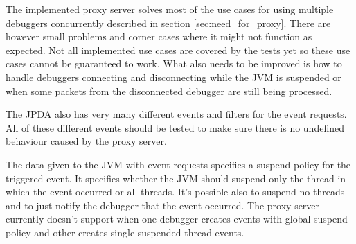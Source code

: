 \documentclass[..thesis.tex]{subfiles}
\begin{document}
The implemented proxy server solves most of the use cases for using multiple debuggers concurrently described in section \ref{sec:need_for_proxy}.
There are however small problems and corner cases where it might not function as expected.
Not all implemented use cases are covered by the tests yet so these use cases cannot be guaranteed to work.
What also needs to be improved is how to handle debuggers connecting and disconnecting while the JVM is suspended or when some packets from the disconnected debugger are still being processed.

The JPDA also has very many different events and filters for the event requests.
All of these different events should be tested to make sure there is no undefined behaviour caused by the proxy server.

The data given to the JVM with event requests specifies a suspend policy for the triggered event.
It specifies whether the JVM should suspend only the thread in which the event occurred or all threads.
It's possible also to suspend no threads and to just notify the debugger that the event occurred.
The proxy server currently doesn't support when one debugger creates events with global suspend policy and other creates single suspended thread events.
\end{document}
